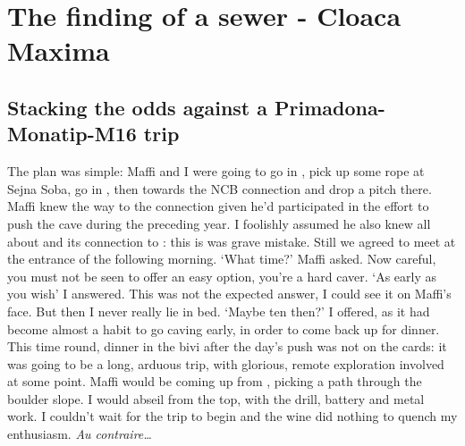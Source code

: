 \section{The finding of a sewer - Cloaca Maxima}

\begin{marginfigure}
\end{marginfigure}

\subsection{Stacking the odds against a Primadona-Monatip-M16 trip}
The plan was simple: Maffi and I were going to go in , pick up some rope at Sejna Soba, go in , then towards the NCB connection and drop a pitch there. Maffi knew the way to the connection given he’d participated in the effort to push the cave during the preceding year. I foolishly assumed he also knew all about  and its connection to : this is was grave mistake. Still we agreed to meet at the entrance of  the following morning. 
‘What time?’ Maffi asked. Now careful, you must not be seen to offer an easy option, you’re a hard caver.
‘As early as you wish’ I answered. This was not the expected answer, I could see it on Maffi’s face. But then I never really lie in bed.
‘Maybe ten then?’ I offered, as it had become almost a habit to go caving early, in order to come back up for dinner. This time round, dinner in the bivi after the day’s push was not on the cards: it was going to be a long, arduous trip, with glorious, remote exploration involved at some point. Maffi would be coming up from , picking a path through the boulder slope. I would abseil from the top, with the drill, battery and metal work. I couldn’t wait for the trip to begin and the wine did nothing to quench my enthusiasm. \textit{Au contraire…}

